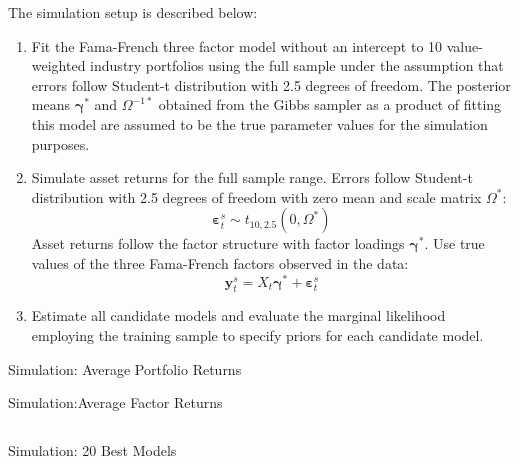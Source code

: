 The simulation setup is described below:
\begin{enumerate}
	\item Fit the Fama-French three factor model without an intercept to 10 value-weighted industry portfolios using the full sample under the assumption that errors follow Student-t distribution with 2.5 degrees of freedom. 
	The posterior means $\boldsymbol{\gamma}^*$ and $\Omega^{-1*}$ obtained from the Gibbs sampler as a product of fitting this model are assumed to be the true parameter values for the simulation purposes.
	\item Simulate asset returns for the full sample range. 
    Errors follow Student-t distribution with 2.5 degrees of freedom with zero mean and scale matrix $\Omega^{*}$:
	\begin{equation*}
		\boldsymbol{\varepsilon}^s_{t}\sim t_{10,2.5 }\left( 0,\Omega^* \right)
	\end{equation*}
	Asset returns follow the factor structure with factor loadings $\boldsymbol{\gamma}^*$. Use true values of the three Fama-French factors observed in the data:
		\begin{equation*}
		\mathbf{y}_t^s = X_t \boldsymbol{\gamma}^* + \boldsymbol{\varepsilon}^s_t
		\end{equation*}

	\item Estimate all candidate models and evaluate the marginal likelihood employing the training sample to specify priors for each candidate model.
\end{enumerate}

\begin{sidewaystable}[ht]
	\centering
	
	\label{table:avPortfolioReturnsSimul}	
	\caption{Simulation: Average Portfolio Returns}
	\bigskip\bigskip
	
	\caption{Simulation:Average Factor Returns}
	\label{table:avFactorReturnsSimul}	
\end{sidewaystable}


\begin{sidewaystable}[ht]$  $
	\centering
	
	\caption{Simulation: 20 Best Models}
	\label{table:bestModelsSimul}
\end{sidewaystable}

